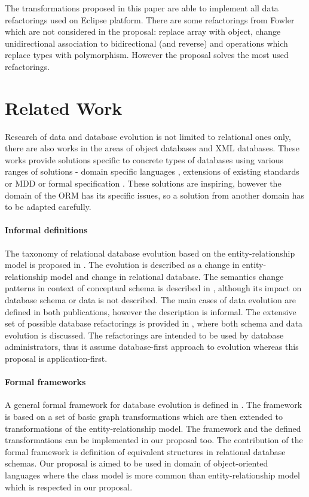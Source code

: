 \documentclass[runningheads]{comsis}
\begin{document}
The transformations proposed in this paper are able to implement all data refactorings used on Eclipse platform. There are some refactorings from Fowler which are not considered in the proposal: replace array with object, change unidirectional association to bidirectional (and reverse) and operations which replace types with polymorphism. However the proposal solves the most used refactorings.



\section{Related Work}
\label{sec:related-work}
Research of data and database evolution is not limited to relational ones only, there are also works in the areas of object databases and XML databases. These works provide solutions specific to concrete types of databases using various ranges of solutions - domain specific languages \cite{SERF}, extensions of existing standards or MDD \cite{Evolution_vs_Reorganization} or formal specification \cite{Tresch:1991vi}. These solutions are inspiring, however the domain of the ORM has its specific issues, so a solution from another domain has to be adapted carefully.

\paragraph{Informal definitions} The taxonomy of relational database evolution based on the entity-relationship model  is proposed in \cite{Roddick:TaxonomyOnERM}. The evolution is described as a change in entity-relationship model and change in relational database.  The semantics change patterns in context of conceptual schema is described in \cite{Wedemeijer:SemanticChangePatternsInConceptualSchema}, although its impact on database schema or data is not described. The main cases of data evolution are defined in both publications, however the description is informal. The extensive set of possible database refactorings is provided in \cite{Ambler:DbRefactoringBook}, where both schema and data evolution is discussed. The refactorings are intended to be used by database administrators, thus it assume database-first approach to evolution whereas this proposal is application-first.   

\paragraph{Formal frameworks} A general formal framework for database evolution is defined in \cite{McBrien:formal-framework-transformation}. The framework is based on a set of basic graph transformations which are then extended to transformations of the entity-relationship model. The framework and the defined transformations can be implemented in our proposal too. The contribution of the formal framework is definition of equivalent structures in relational database schemas. Our proposal is aimed to be used in domain of object-oriented languages where the class model is more common than entity-relationship model which is respected in our proposal. 
\end{document}
